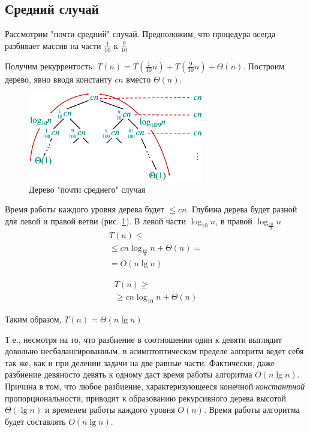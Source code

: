 \documentclass[11pt]{article}
\begin{document}
\subsection{Средний случай}

Рассмотрим "почти средний" случай. Предположим, что процедура всегда разбивает массив на части $\frac{1}{10}$ к $\frac{9}{10}$

Получим рекуррентость: $T(n) = T(\frac{1}{10} n) + T(\frac{9}{10} n) + \Theta(n)$. Построим дерево, явно вводя константу $c n$ вместо $\Theta(n)$.
\begin{figure}[ht]
  \centering
  \includegraphics[width=3in]{lecture4/tree2.eps}
  \caption{Дерево "почти среднего" случая}
  \label{fig:tree2}
\end{figure}

Время работы каждого уровня дерева будет $\leqslant c n$. Глубина дерева будет разной для левой и правой ветви (рис. \ref{fig:tree2}). В левой части $\log_{10}n$, в правой $\log_{\frac{10}{9}}n$
\begin{align*}
  T(n) \leqslant \\
    \leqslant c n \log_{\frac{10}{9}}n + \Theta(n) = \\
    = O(n \lg n)
\end{align*}

\begin{align*}
  T(n) \geqslant \\
    \geqslant c n \log_{10}n + \Theta(n)
\end{align*}

Таким образом, $T(n) = \Theta(n \lg n)$

Т.е., несмотря на то, что разбиение в соотношении один к девяти выглядит довольно несбалансированным, в асимптоптическом пределе алгоритм ведет себя так же, как и при делении задачи на две равные части. Фактически, даже разбиение девяносто девять к одному даст время работы алгоритма $O(n \lg n)$. Причина в том, что любое разбиение, характеризующееся конечной \emph{константной} пропорциональности, приводит к образованию рекурсивного дерева высотой $\Theta(\lg n)$ и временем работы каждого уровня $O(n)$. Время работы алгоритма будет составлять $O(n \lg n)$.
\end{document}
